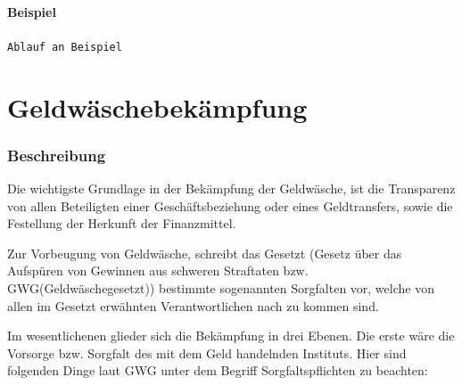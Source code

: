 \documentclass{article}
\begin{document}
        \subsection[Beispiel]{Beispiel}

            \texttt{Ablauf an Beispiel}

\newpage

\part[Bekämpfung]{Geldwäschebekämpfung}

    \section[Beschreibung]{Beschreibung}

        Die wichtigste Grundlage in der Bekämpfung der Geldwäsche, ist die Transparenz von allen Beteiligten einer Geschäftsbeziehung oder eines Geldtransfers, sowie die Festellung der Herkunft der Finanzmittel.

        Zur Vorbeugung von Geldwäsche, schreibt das Gesetzt (Gesetz über das Aufspüren von Gewinnen aus schweren Straftaten bzw. GWG(Geldwäschegesetzt)) bestimmte sogenannten Sorgfalten vor, welche von allen im Gesetzt erwähnten Verantwortlichen nach zu kommen sind.

        Im wesentlichenen glieder sich die Bekämpfung in drei Ebenen. Die erste wäre die Vorsorge bzw. Sorgfalt des mit dem Geld handelnden Instituts. Hier sind folgenden Dinge laut GWG unter dem Begriff Sorgfaltspflichten zu beachten:
\end{document}
